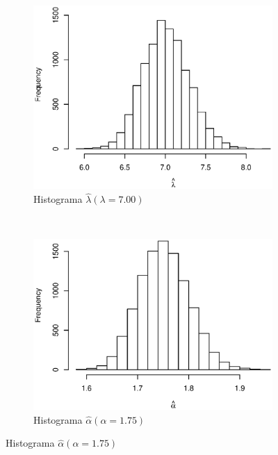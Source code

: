 \documentclass[11pt]{article}
\numberwithin{equation}{section} %
\begin{document}
\begin{figure}[htbp]
\centering
\begin{subfigure}[b]{0.5\textwidth}
\centering
\includegraphics[width=\textwidth, trim=0 0.5cm 0 1cm]{histl1.eps}
\caption{Histograma $\hat{\lambda} (\lambda=7.00)$}
\label{fig:histl1}
\end{subfigure}%
~ %
\begin{subfigure}[b]{0.5\textwidth}
\centering
\includegraphics[width=\textwidth, trim=0 0.5cm 0 1cm]{hista1.eps}
\caption{Histograma $\hat{\alpha} (\alpha=1.75)$}
\label{fig:hista1}
\end{subfigure}


\end{figure}
\end{document}
